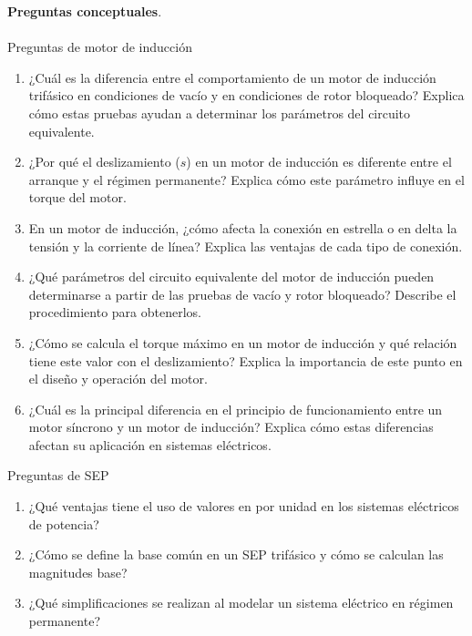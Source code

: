 \documentclass[
  11pt,
  letterpaper,
   addpoints,
   answers
  ]{exam}
\begin{document}
\begin{questions}
    \question \textbf{Preguntas conceptuales}.\\\\
    Preguntas de motor de inducción
    \begin{enumerate}
        \item ¿Cuál es la diferencia entre el comportamiento de un motor de inducción trifásico en condiciones de vacío y en condiciones de rotor bloqueado? Explica cómo estas pruebas ayudan a determinar los parámetros del circuito equivalente.
    
        \item ¿Por qué el deslizamiento (\(s\)) en un motor de inducción es diferente entre el arranque y el régimen permanente? Explica cómo este parámetro influye en el torque del motor.
    
        \item En un motor de inducción, ¿cómo afecta la conexión en estrella o en delta la tensión y la corriente de línea? Explica las ventajas de cada tipo de conexión.
    
        \item ¿Qué parámetros del circuito equivalente del motor de inducción pueden determinarse a partir de las pruebas de vacío y rotor bloqueado? Describe el procedimiento para obtenerlos.
    
        \item ¿Cómo se calcula el torque máximo en un motor de inducción y qué relación tiene este valor con el deslizamiento? Explica la importancia de este punto en el diseño y operación del motor.
    
        \item ¿Cuál es la principal diferencia en el principio de funcionamiento entre un motor síncrono y un motor de inducción? Explica cómo estas diferencias afectan su aplicación en sistemas eléctricos.
    \end{enumerate}
    Preguntas de SEP
    \begin{enumerate}
        \item ¿Qué ventajas tiene el uso de valores en por unidad en los sistemas eléctricos de potencia?
    
        \item ¿Cómo se define la base común en un SEP trifásico y cómo se calculan las magnitudes base?
    
        \item ¿Qué simplificaciones se realizan al modelar un sistema eléctrico en régimen permanente?
    

\end{enumerate}
\end{questions}
\end{document}
